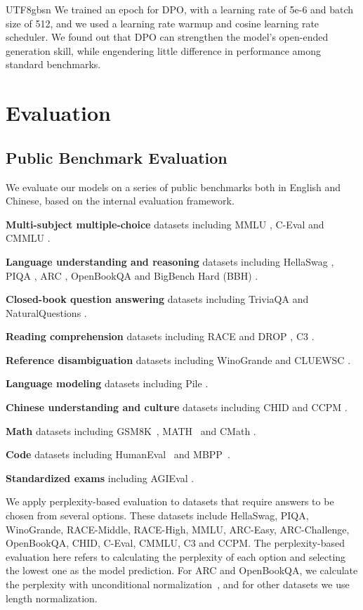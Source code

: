 \documentclass[11pt, a4paper, logo, copyright, nonumbering]{deepseek}
\begin{document}
\begin{CJK*}{UTF8}{gbsn}
We trained an epoch for DPO, with a learning rate of 5e-6 and batch size of 512, and we used a learning rate warmup and cosine learning rate scheduler.
We found out that DPO can strengthen the model's open-ended generation skill, while engendering little difference in performance among standard benchmarks.

\section{Evaluation}

\label{sec:evluation}

\subsection{Public Benchmark Evaluation}
We evaluate our models on a series of public benchmarks both in English and Chinese, based on the internal evaluation framework. 

\textbf{Multi-subject multiple-choice} datasets including MMLU \citep{mmlu}, C-Eval \citep{ceval} and CMMLU \citep{cmmlu}.

\textbf{Language understanding and reasoning} datasets including HellaSwag \citep{hellaswag}, PIQA \citep{piqa}, ARC \citep{arc}, OpenBookQA \citep{mihaylov2018suit} and BigBench Hard (BBH) \citep{bbh}.

\textbf{Closed-book question answering} datasets including TriviaQA \citep{joshi-etal-2017-triviaqa} and NaturalQuestions \citep{naturalquestions}.

\textbf{Reading comprehension} datasets including RACE \cite{race} and DROP \citep{drop},  C3 \citep{sun2019investigating}.

\textbf{Reference disambiguation} datasets including WinoGrande \cite{sakaguchi2019winogrande} and CLUEWSC \citep{clue}.

\textbf{Language modeling} datasets including Pile \citep{pile}.

\textbf{Chinese understanding and culture} datasets including CHID \citep{chid} and CCPM \citep{li2021ccpm}.

\textbf{Math} datasets including GSM8K~\citep{gsm8k}, MATH~\citep{hendrycks2021measuring} and CMath \citep{wei2023cmath}.

\textbf{Code} datasets including HumanEval~\citep{codex} and MBPP~\citep{mbpp}.

\textbf{Standardized exams} including AGIEval \citep{agieval}.

We apply perplexity-based evaluation to datasets that require answers to be chosen from several options. These datasets include HellaSwag, PIQA, WinoGrande, RACE-Middle, RACE-High, MMLU, ARC-Easy, ARC-Challenge, OpenBookQA, CHID, C-Eval, CMMLU, C3 and CCPM. The perplexity-based evaluation here refers to calculating the perplexity of each option and selecting the lowest one as the model prediction. For ARC and OpenBookQA, we calculate the perplexity with unconditional normalization~\citep{brown2020language}, and for other datasets we use length normalization.


\end{CJK*}
\end{document}
